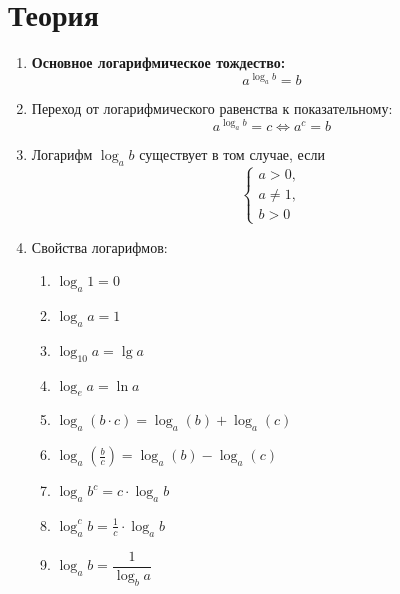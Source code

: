 \documentclass[12pt, a4paper]{article}
\begin{document}
	
  
\section{Теория}
\begin{enumerate}
	\item \textbf{Основное логарифмическое тождество:} $$a^{\log_a b}=b$$
	\item Переход от логарифмического равенства к показательному: $$a^{\log_a b}=c \Leftrightarrow a^c=b$$
	\item Логарифм $\log_a b$ существует в том случае, если
	$$\left\{
	\begin{array}{l}
		a>0,\\
		a\neq1,\\
		b>0
	\end{array}
	\right.$$
	\item Свойства логарифмов:
	\begin{multicols}{2}
		\begin{enumerate}[label=\arabic*)]
			\item $\log_a 1 = 0$
			\item $\log_a a = 1$
			\item $\log_{10} a = \lg a$
			\item $\log_e a = \ln a$
			\item $\log_a (b\cdot c) = \log_a (b) + \log_a (c)$
			\item $\log_a (\frac{b}{c}) = \log_a (b) - \log_a (c)$
			\item $\log_a b^c = c\cdot\log_a b$
			\item $\log_a^c b = \frac{1}{c}\cdot\log_a b$
			\item $\log_a b = \dfrac{1}{\log_b a}$
		\end{enumerate}
	\end{multicols}
\end{enumerate}
\end{document}
